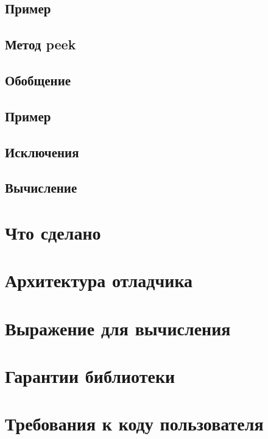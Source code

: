 \subsection{Пример}

\subsection{Метод peek}


\subsection{Обобщение}

\subsection{Пример}

\subsection{Исключения}

\subsection{Вычисление}


\section{Что сделано}



\appendix
\section{Архитектура отладчика}

\section{Выражение для вычисления}

\section{Гарантии библиотеки}

\section{Требования к коду пользователя}
